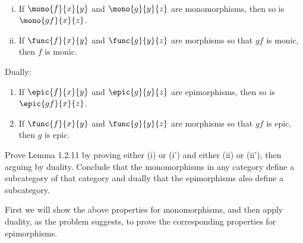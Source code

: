 \documentclass[../../main]{subfiles}
\begin{document}
\paragraph{}
\begin{lemma}\leavevmode
	\begin{enumerate}[(i)]
		\item If \(\mono{f}{x}{y}\) and \(\mono{g}{y}{z}\) are monomorphisms,
			then so is \(\mono{gf}{x}{z}\).

		\item If \(\func{f}{x}{y}\) and \(\func{g}{y}{z}\) are morphisms so
			that \(gf\) is monic, then \(f\) is monic.
	\end{enumerate}
	Dually:
	\begin{enumerate}[(i')]
		\item If \(\epic{f}{x}{y}\) and \(\epic{g}{y}{z}\) are epimorphisms,
			then so is \(\epic{gf}{x}{z}\).

		\item If \(\func{f}{x}{y}\) and \(\func{g}{y}{z}\) are morphisms so
			that \(gf\) is epic, then \(g\) is epic.
	\end{enumerate}
\end{lemma}
\popthm

\begin{exercise}
	Prove Lemma 1.2.11 by proving either (i) or (i') and either (ii) or (ii'),
	then arguing by duality. Conclude that the monomorphisms in any category
	define a subcategory of that category and dually that the epimorphisms also
	define a subcategory.
\end{exercise}

First we will show the above properties for monomorphisms, and then apply
duality, as the problem suggests, to prove the corresponding properties for
epimorphisms.
\end{document}
